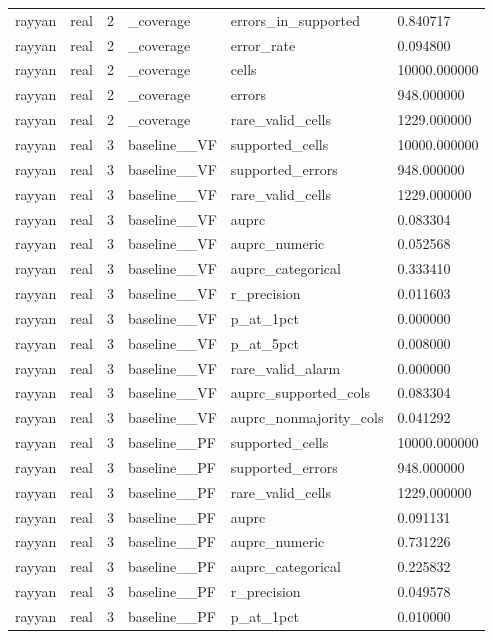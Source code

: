 \begin{tabular}{llllll}
rayyan & real & 2 & \_coverage & errors\_in\_supported & 0.840717 \\
rayyan & real & 2 & \_coverage & error\_rate & 0.094800 \\
rayyan & real & 2 & \_coverage & cells & 10000.000000 \\
rayyan & real & 2 & \_coverage & errors & 948.000000 \\
rayyan & real & 2 & \_coverage & rare\_valid\_cells & 1229.000000 \\
rayyan & real & 3 & baseline\_\_VF & supported\_cells & 10000.000000 \\
rayyan & real & 3 & baseline\_\_VF & supported\_errors & 948.000000 \\
rayyan & real & 3 & baseline\_\_VF & rare\_valid\_cells & 1229.000000 \\
rayyan & real & 3 & baseline\_\_VF & auprc & 0.083304 \\
rayyan & real & 3 & baseline\_\_VF & auprc\_numeric & 0.052568 \\
rayyan & real & 3 & baseline\_\_VF & auprc\_categorical & 0.333410 \\
rayyan & real & 3 & baseline\_\_VF & r\_precision & 0.011603 \\
rayyan & real & 3 & baseline\_\_VF & p\_at\_1pct & 0.000000 \\
rayyan & real & 3 & baseline\_\_VF & p\_at\_5pct & 0.008000 \\
rayyan & real & 3 & baseline\_\_VF & rare\_valid\_alarm & 0.000000 \\
rayyan & real & 3 & baseline\_\_VF & auprc\_supported\_cols & 0.083304 \\
rayyan & real & 3 & baseline\_\_VF & auprc\_nonmajority\_cols & 0.041292 \\
rayyan & real & 3 & baseline\_\_PF & supported\_cells & 10000.000000 \\
rayyan & real & 3 & baseline\_\_PF & supported\_errors & 948.000000 \\
rayyan & real & 3 & baseline\_\_PF & rare\_valid\_cells & 1229.000000 \\
rayyan & real & 3 & baseline\_\_PF & auprc & 0.091131 \\
rayyan & real & 3 & baseline\_\_PF & auprc\_numeric & 0.731226 \\
rayyan & real & 3 & baseline\_\_PF & auprc\_categorical & 0.225832 \\
rayyan & real & 3 & baseline\_\_PF & r\_precision & 0.049578 \\
rayyan & real & 3 & baseline\_\_PF & p\_at\_1pct & 0.010000 \\

\end{tabular}
